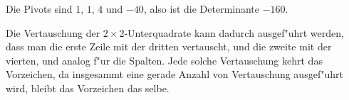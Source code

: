 \begin{loesung}
\begin{teilaufgaben}
Die Pivots sind $1$, $1$, $4$ und $-40$, also ist die Determinante $-160$.

\item Die Vertauschung der $2\times 2$-Unterquadrate kann dadurch
ausgef"uhrt werden, dass man die erste Zeile mit der dritten vertauscht,
und die zweite mit der vierten, und analog f"ur die Spalten. Jede
solche Vertauschung kehrt das Vorzeichen, da insgesammt eine gerade
Anzahl von Vertauschung ausgef"uhrt wird, bleibt das Vorzeichen das
selbe.
\qedhere
\end{teilaufgaben}
\end{loesung}
